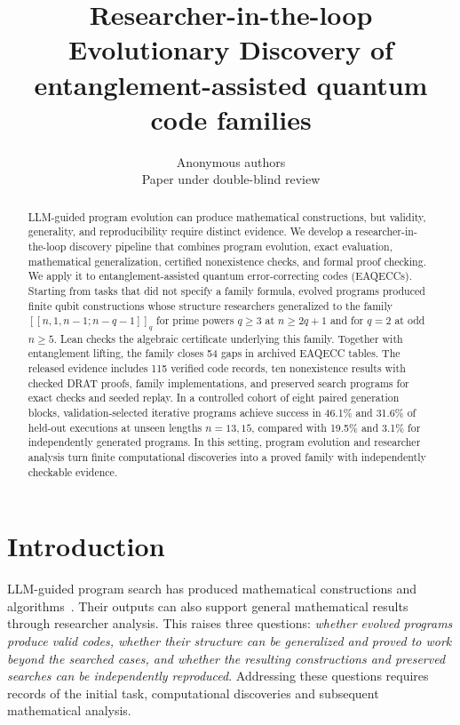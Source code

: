 \documentclass{article}
\title{Researcher-in-the-loop\\
  Evolutionary Discovery of\\
  entanglement-assisted quantum code families}
\author{Anonymous authors \\ Paper under double-blind review}
\begin{document}
\maketitle

\begin{abstract}
LLM-guided program evolution can produce mathematical constructions,
but validity, generality, and reproducibility require distinct evidence.
We develop a researcher-in-the-loop discovery pipeline that combines
program evolution, exact evaluation, mathematical generalization,
certified nonexistence checks, and formal proof checking. We apply it
to entanglement-assisted quantum error-correcting codes (EAQECCs).
Starting from tasks that did not specify a family formula, evolved
programs produced finite qubit constructions whose structure researchers
generalized to the family $[[n,1,n-1;n-q-1]]_q$ for prime powers
$q\ge3$ at $n\ge2q+1$ and for $q=2$ at odd $n\ge5$. Lean checks the
algebraic certificate underlying this family. Together with entanglement
lifting, the family closes 54 gaps in archived EAQECC tables. The
released evidence includes 115 verified code records, ten nonexistence
results with checked DRAT proofs, family implementations, and preserved
search programs for exact checks and seeded replay. In a controlled
cohort of eight paired generation blocks, validation-selected iterative
programs achieve success in 46.1\% and 31.6\% of held-out executions at
unseen lengths $n=13,15$, compared with 19.5\% and 3.1\% for independently
generated programs. In this setting, program evolution and researcher
analysis turn finite computational discoveries into a proved family
with independently checkable evidence.
\end{abstract}

\section{Introduction}

LLM-guided program search has produced mathematical constructions and
algorithms~\citep{FunSearch,AlphaEvolve}. Their outputs can also support
general mathematical results through researcher analysis. This raises
three questions: \emph{whether evolved programs produce valid codes,
whether their structure can be generalized and proved to work beyond
the searched cases, and whether the resulting constructions and preserved
searches can be independently reproduced}. Addressing these questions
requires records of the initial task, computational discoveries and
subsequent mathematical analysis.
\end{document}
